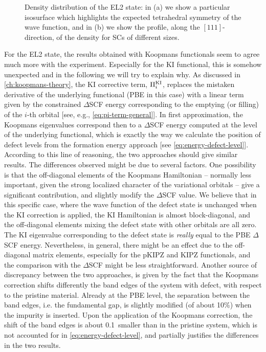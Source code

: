 \begin{figure}
    \centering
     \qquad
    \caption[Density distribution of the EL2 state]{Density distribution of the EL2 state: in (a) we show a particular isosurface which highlights the expected tetrahedral symmetry of the wave function, and in (b) we show the profile, along the $[111]$-direction, of the density for SCs of different sizes.}
    \label{fig:extension-defect-state}
\end{figure}

For the EL2 state, the results obtained with Koopmans functionals seem to agree much more with the experiment. Especially for the KI functional, this is somehow unexpected and in the following we will try to explain why. As discussed in \cref{ch:koopmans-theory}, the KI corrective term, $\Pi_i^{\rm KI}$, replaces the mistaken derivative of the underlying functional (PBE in this case) with a linear term given by the constrained $\Delta$SCF energy corresponding to the emptying (or filling) of the $i$-th orbital [see, e.g., \cref{eq:pi-term-general}]. In first approximation, the Koopmans eigenvalues correspond then to a $\Delta$SCF energy computed at the level of the underlying functional, which is exactly the way we calculate the position of defect levels from the formation energy approach [see \cref{eq:energy-defect-level}]. According to this line of reasoning, the two approaches should give similar results. The differences observed might be due to several factors. One possibility is that the off-diagonal elements of the Koopmans Hamiltonian -- normally less important, given the strong localized character of the variational orbitals -- give a significant contribution, and slightly modify the $\Delta$SCF value. We believe that in this specific case, where the wave function of the defect state is unchanged when the KI correction is applied, the KI Hamiltonian is almost block-diagonal, and the off-diagonal elements mixing the defect state with other orbitals are all zero. The KI eigenvalue corresponding to the defect state is \emph{really} equal to the PBE $\Delta$SCF energy. Nevertheless, in general, there might be an effect due to the off-diagonal matrix elements, especially for the pKIPZ and KIPZ functionals, and the comparison with the $\Delta$SCF might be less straightforward. Another source of discrepancy between the two approaches, is given by the fact that the Koopmans correction shifts differently the band edges of the system with defect, with respect to the pristine material. Already at the PBE level, the separation between the band edges, i.e. the fundamental gap, is slightly modified (of about 10\%) when the impurity is inserted. Upon the application of the Koopmans correction, the shift of the band edges is about 0.1~\ev smaller than in the pristine system, which is not accounted for in \cref{eq:energy-defect-level}, and partially justifies the differences in the two results.

